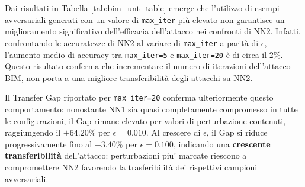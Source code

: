 \documentclass[a4paper, 12pt]{article}
\begin{document}
\begin{table}[htbp]
    \centering
    \setlength{\tabcolsep}{12pt} %
    \vspace{0.2cm}
    \caption{Risultati di transferabilità per l'attacco BIM Untargeted.}
    \label{tab:bim_unt_table}
\end{table}



Dai risultati in Tabella \ref{tab:bim_unt_table} emerge che l'utilizzo di esempi avversariali generati con 
un valore di \texttt{max\_iter} più elevato non garantisce un miglioramento 
significativo dell'efficacia dell'attacco nei confronti di NN2. Infatti, 
confrontando le accuratezze di NN2 al variare di \texttt{max\_iter} a parità 
di $\epsilon$, l'aumento medio di accuracy tra \texttt{max\_iter=5} e 
\texttt{max\_iter=20} è di circa il $2\%$. Questo risultato conferma che incrementare il numero di iterazioni dell'attacco BIM, 
non porta a una migliore transferibilità degli attacchi su NN2.

Il Transfer Gap riportato per \texttt{max\_iter=20} conferma ulteriormente questo 
comportamento: nonostante NN1 sia quasi completamente compromesso in tutte le 
configurazioni, il Gap rimane elevato per valori di perturbazione contenuti, 
raggiungendo il $+64.20\%$ per $\epsilon = 0.010$. Al crescere di $\epsilon$, 
il Gap si riduce progressivamente fino al $+3.40\%$ per $\epsilon = 0.100$, indicando una \textbf{crescente transferibilità} 
dell'attacco: perturbazioni piu' marcate riescono a compromettere NN2 favorendo la trasferibilità dei rispettivi campioni avversariali.
\end{document}
